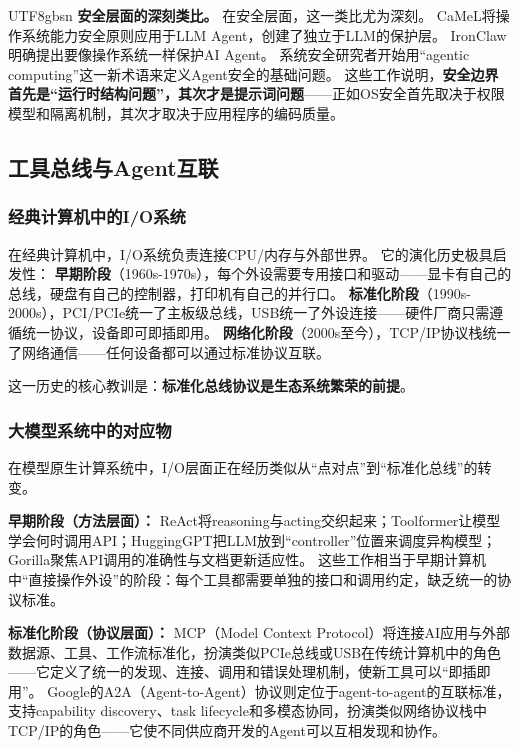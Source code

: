 \documentclass[11pt,a4paper]{article}
\begin{document}
\begin{CJK*}{UTF8}{gbsn}
\textbf{安全层面的深刻类比。}
在安全层面，这一类比尤为深刻。
CaMeL将操作系统能力安全原则应用于LLM Agent，创建了独立于LLM的保护层\cite{debenedetti2025camel}。
IronClaw明确提出要像操作系统一样保护AI Agent\cite{ironclaw2025}。
系统安全研究者开始用``agentic computing''这一新术语来定义Agent安全的基础问题\cite{agenticsecurity2025}。
这些工作说明，\textbf{安全边界首先是``运行时结构问题''，其次才是提示词问题}——正如OS安全首先取决于权限模型和隔离机制，其次才取决于应用程序的编码质量。

\subsection{工具总线与Agent互联}
\label{sec:io}

\subsubsection{经典计算机中的I/O系统}

在经典计算机中，I/O系统负责连接CPU/内存与外部世界。
它的演化历史极具启发性：
\textbf{早期阶段}（1960s-1970s），每个外设需要专用接口和驱动——显卡有自己的总线，硬盘有自己的控制器，打印机有自己的并行口。
\textbf{标准化阶段}（1990s-2000s），PCI/PCIe统一了主板级总线，USB统一了外设连接——硬件厂商只需遵循统一协议，设备即可即插即用。
\textbf{网络化阶段}（2000s至今），TCP/IP协议栈统一了网络通信——任何设备都可以通过标准协议互联。

这一历史的核心教训是：\textbf{标准化总线协议是生态系统繁荣的前提}。

\subsubsection{大模型系统中的对应物}

在模型原生计算系统中，I/O层面正在经历类似从``点对点''到``标准化总线''的转变。

\textbf{早期阶段（方法层面）：}
ReAct将reasoning与acting交织起来\cite{yao2023react}；Toolformer让模型学会何时调用API\cite{schick2023toolformer}；HuggingGPT把LLM放到``controller''位置来调度异构模型\cite{hugginggpt2023}；Gorilla聚焦API调用的准确性与文档更新适应性\cite{patil2024gorilla}。
这些工作相当于早期计算机中``直接操作外设''的阶段：每个工具都需要单独的接口和调用约定，缺乏统一的协议标准。

\textbf{标准化阶段（协议层面）：}
MCP（Model Context Protocol）将连接AI应用与外部数据源、工具、工作流标准化\cite{mcp_intro_2026}，扮演类似PCIe总线或USB在传统计算机中的角色——它定义了统一的发现、连接、调用和错误处理机制，使新工具可以``即插即用''。
Google的A2A（Agent-to-Agent）协议则定位于agent-to-agent的互联标准\cite{google_a2a_2025}，支持capability discovery、task lifecycle和多模态协同，扮演类似网络协议栈中TCP/IP的角色——它使不同供应商开发的Agent可以互相发现和协作。


\end{CJK*}
\end{document}
